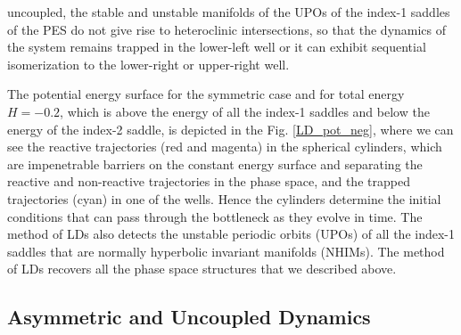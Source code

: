\documentclass[10pt,aps,onecolumn,superscriptaddress]{revtex4-2}
\begin{document}
uncoupled, the stable and unstable manifolds of the UPOs of the index-1 saddles of the PES do not give rise to heteroclinic intersections, so that the dynamics of the system remains trapped in the lower-left well or it can exhibit sequential isomerization to the lower-right or upper-right well.

The potential energy surface for the symmetric case and for total energy $H = -0.2$, which is above the energy of all the index-1 saddles and below the energy of the index-2 saddle, is depicted in the Fig. \ref{LD_pot_neg}, where we can see the reactive trajectories (red and magenta) in the spherical cylinders, which are impenetrable barriers on the constant energy surface and separating the reactive and non-reactive trajectories in the phase space, and the trapped trajectories (cyan) in one of the wells. Hence the cylinders determine the initial conditions that can pass through the bottleneck as they evolve in time.  The method of LDs also detects the unstable periodic orbits (UPOs) of all the index-1 saddles that are normally hyperbolic invariant manifolds (NHIMs). The method of LDs recovers all the phase space structures that we described above. 

\subsection{Asymmetric and Uncoupled Dynamics}
\end{document}
